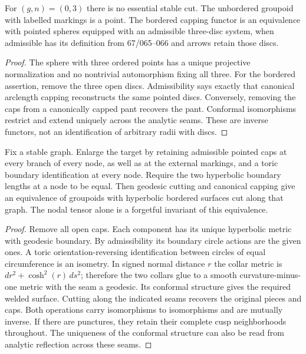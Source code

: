 \begin{proposition}\label{A1-zero}
For $(g,n)=(0,3)$ there is no essential stable cut. The unbordered groupoid with labelled markings is a point. The bordered capping functor is an equivalence with pointed spheres equipped with an admissible three-disc system, when admissible has its definition from 67/065--066 and arrows retain those discs.
\end{proposition}
\begin{proof}
The sphere with three ordered points has a unique projective normalization and no nontrivial automorphism fixing all three. For the bordered assertion, remove the three open discs. Admissibility says exactly that canonical arclength capping reconstructs the same pointed discs. Conversely, removing the caps from a canonically capped pant recovers the pant. Conformal isomorphisms restrict and extend uniquely across the analytic seams. These are inverse functors, not an identification of arbitrary radii with discs.
\end{proof}

\begin{proposition}\label{A1-retained-discs}
Fix a stable graph. Enlarge the target by retaining admissible pointed caps at every branch of every node, as well as at the external markings, and a toric boundary identification at every node. Require the two hyperbolic boundary lengths at a node to be equal. Then geodesic cutting and canonical capping give an equivalence of groupoids with hyperbolic bordered surfaces cut along that graph. The nodal tensor alone is a forgetful invariant of this equivalence.
\end{proposition}
\begin{proof}
Remove all open caps. Each component has its unique hyperbolic metric with geodesic boundary. By admissibility its boundary circle actions are the given ones. A toric orientation-reversing identification between circles of equal circumference is an isometry. In signed normal distance $r$ the collar metric is $dr^2+\cosh^2(r)\,ds^2$; therefore the two collars glue to a smooth curvature-minus-one metric with the seam a geodesic. Its conformal structure gives the required welded surface. Cutting along the indicated seams recovers the original pieces and caps. Both operations carry isomorphisms to isomorphisms and are mutually inverse. If there are punctures, they retain their complete cusp neighborhoods throughout. The uniqueness of the conformal structure can also be read from analytic reflection across these seams.
\end{proof}

